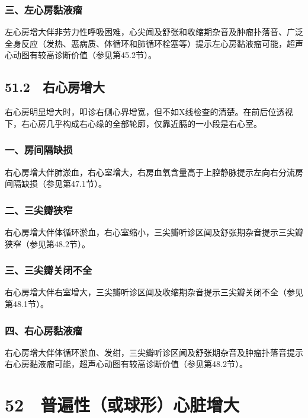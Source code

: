 \subsubsection{三、左心房黏液瘤}

左心房增大伴非劳力性呼吸困难，心尖闻及舒张和收缩期杂音及肿瘤扑落音、广泛全身反应（发热、恶病质、体循环和肺循环栓塞等）提示左心房黏液瘤可能，超声心动图有较高诊断价值（参见第45.2节）。

\subsection{51.2　右心房增大}

右心房明显增大时，叩诊右侧心界增宽，但不如X线检查的清楚。在前后位透视下，右心房几乎构成右心缘的全部轮廓，仅靠近膈的一小段是右心室。

\subsubsection{一、房间隔缺损}

右心房增大伴肺淤血，右心室增大，右房血氧含量高于上腔静脉提示左向右分流房间隔缺损（参见第47.1节）。

\subsubsection{二、三尖瓣狭窄}

右心房增大伴体循环淤血，右心室缩小，三尖瓣听诊区闻及舒张期杂音提示三尖瓣狭窄（参见第48.2节）。

\subsubsection{三、三尖瓣关闭不全}

右心房增大伴右室增大，三尖瓣听诊区闻及收缩期杂音提示三尖瓣关闭不全（参见第48.1节）。

\subsubsection{四、右心房黏液瘤}

右心房增大伴体循环淤血、发绀，三尖瓣听诊区闻及舒张期杂音及肿瘤扑落音提示右心房黏液瘤可能，超声心动图有较高诊断价值（参见第48.2节）。

\protect\hypertarget{text00137.html}{}{}

\section{52　普遍性（或球形）心脏增大}


